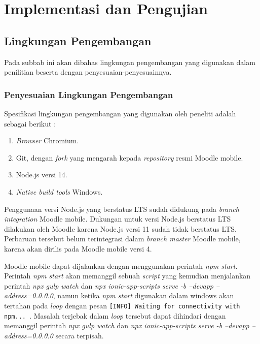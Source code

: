 \chapter{Implementasi dan Pengujian}

\section{Lingkungan Pengembangan}
Pada subbab ini akan dibahas lingkungan pengembangan yang digunakan dalam penilitian beserta dengan penyesuaian-penyesuainnya.
\subsection{Penyesuaian Lingkungan Pengembangan}
Spesifikasi lingkungan pengembangan yang digunakan oleh peneliti adalah sebagai berikut :

\begin{enumerate}
	\item \textit{Browser} Chromium.
	\item Git, dengan \textit{fork} yang mengarah kepada \textit{repository} resmi Moodle mobile.
	\item Node.js versi 14.
	\item \textit{Native build tools} Windows.
\end{enumerate} 

Penggunaan versi Node.js yang berstatus LTS sudah didukung pada \textit{branch integration} Moodle mobile. Dukungan untuk versi Node.js berstatus LTS dilakukan oleh Moodle karena Node.js versi 11 sudah tidak berstatus LTS. Perbaruan tersebut belum terintegrasi dalam \textit{branch master} Moodle mobile, karena akan dirilis pada Moodle mobile versi 4. \cite{MoodleTracker:Node11+} 

Moodle mobile dapat dijalankan dengan menggunakan perintah \textit{npm start}.  Perintah \textit{npm start} akan memanggil sebuah \textit{script} yang kemudian menjalankan perintah \textit{npx gulp watch} dan \textit{npx ionic-app-scripts serve -b --devapp --address=0.0.0.0}, namun ketika \textit{npm start} digunakan dalam windows akan tertahan pada \textit{loop} dengan pesan \texttt{[INFO] Waiting for connectivity with npm...	}. Masalah terjebak dalam \textit{loop} tersebut dapat dihindari dengan memanggil perintah \textit{npx gulp watch} dan \textit{npx ionic-app-scripts serve -b --devapp --address=0.0.0.0} secara terpisah. 

